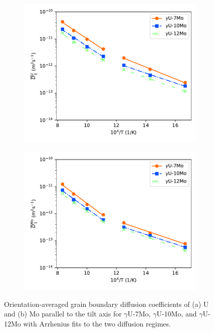 \documentclass{elsarticle}
\providecommand{\DIFadd}[1]{{\protect\color{blue} \sf #1}} %
\providecommand{\DIFdel}[1]{}
\providecommand{\DIFaddFL}[1]{\DIFadd{#1}} %
\providecommand{\DIFdelFL}[1]{\DIFdel{#1}} %
\providecommand{\DIFaddbeginFL}{} %
\providecommand{\DIFaddendFL}{} %
\providecommand{\DIFdelbeginFL}{} %
\providecommand{\DIFdelendFL}{} %
\begin{document}
\begin{figure}[!ht]
\DIFaddbeginFL \begin{subfigure}{0.49\textwidth}
	\DIFaddendFL \centering
	\DIFdelbeginFL %
\DIFdelendFL \caption{\DIFdelbeginFL \DIFdelFL{Arrehenius fits to two diffusion regimes.}\DIFdelendFL }
	\DIFaddbeginFL \includegraphics[width=\textwidth]{2reg_U_Dz.pdf}
\end{subfigure}
\begin{subfigure}{0.49\textwidth}
	\centering
	\caption{}
	\includegraphics[width=\textwidth]{2reg_Mo_Dz.pdf}
\end{subfigure}
\caption{\DIFaddFL{Orientation-averaged grain boundary diffusion coefficients of (a) U and (b) Mo parallel to the tilt axis for $\gamma$U-7Mo, $\gamma$U-10Mo, and $\gamma$U-12Mo with Arrhenius fits to the two diffusion regimes.}}
\DIFaddendFL \label{fig:2reg}
\end{figure}
\end{document}

